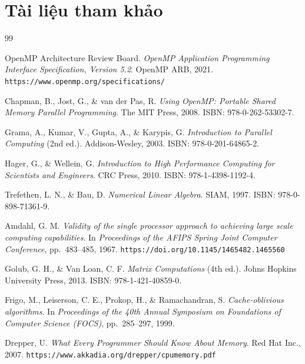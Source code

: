 ﻿\chapter*{Tài liệu tham khảo}

\begin{thebibliography}{99}

OpenMP Architecture Review Board.
\textit{OpenMP Application Programming Interface Specification, Version 5.2}.
OpenMP ARB, 2021.
\texttt{https://www.openmp.org/specifications/}

Chapman, B., Jost, G., \& van der Pas, R.
\textit{Using OpenMP: Portable Shared Memory Parallel Programming}.
The MIT Press, 2008. ISBN: 978-0-262-53302-7.

Grama, A., Kumar, V., Gupta, A., \& Karypis, G.
\textit{Introduction to Parallel Computing} (2nd ed.).
Addison-Wesley, 2003. ISBN: 978-0-201-64865-2.

Hager, G., \& Wellein, G.
\textit{Introduction to High Performance Computing for Scientists and Engineers}.
CRC Press, 2010. ISBN: 978-1-4398-1192-4.

Trefethen, L. N., \& Bau, D.
\textit{Numerical Linear Algebra}.
SIAM, 1997. ISBN: 978-0-898-71361-9.

Amdahl, G. M.
\textit{Validity of the single processor approach to achieving large scale computing capabilities}.
In \textit{Proceedings of the AFIPS Spring Joint Computer Conference}, pp.~483--485, 1967.
\texttt{https://doi.org/10.1145/1465482.1465560}

Golub, G. H., \& Van Loan, C. F.
\textit{Matrix Computations} (4th ed.).
Johns Hopkins University Press, 2013. ISBN: 978-1-421-40859-0.

Frigo, M., Leiserson, C. E., Prokop, H., \& Ramachandran, S.
\textit{Cache-oblivious algorithms}.
In \textit{Proceedings of the 40th Annual Symposium on Foundations of Computer Science (FOCS)}, pp.~285--297, 1999.

Drepper, U.
\textit{What Every Programmer Should Know About Memory}.
Red Hat Inc., 2007.
\texttt{https://www.akkadia.org/drepper/cpumemory.pdf}

\end{thebibliography}

